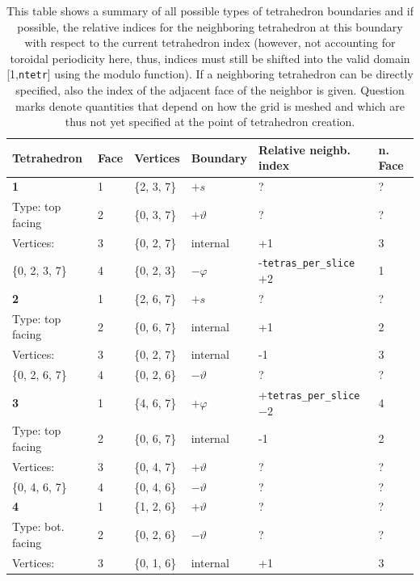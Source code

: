 \documentclass[./main.tex]{subfiles}
\begin{document}
\begin{centering}
	\begin{table}[H]
		\caption{This table shows a summary of all possible types of tetrahedron boundaries and if possible, the relative indices for the neighboring tetrahedron at this boundary with respect to the current tetrahedron index (however, not accounting for toroidal periodicity here, thus, indices must still be shifted into the valid domain [1,\texttt{ntetr}] using the modulo function). If a neighboring tetrahedron can be directly specified, also the index of the adjacent face of the neighbor is given. Question marks denote quantities that depend on how the grid is meshed and which are thus not yet specified at the point of tetrahedron creation.}
		\begin{tabular}{|l|l|l|l|l|l|}
\hline
			 \rowcolor{lightgray}
			Tetrahedron&Face&Vertices&Boundary&Relative neighb. index&n. Face\\
\hline	
			\textbf{1}					&1		&\{2, 3, 7\}		&$+s$			&?			&?		\\
			Type: top facing			&2		&\{0, 3, 7\}		&$+\vartheta$	&?			&?		\\
			Vertices: 	&3		&\{0, 2, 7\}		&internal		&+1			&3		\\
			\{0, 2, 3, 7\}							&4		&\{0, 2, 3\}		&$-\varphi$		&-\texttt{tetras\_per\_slice}$+2$	&1\\
\hline
			\textbf{2}					&1		&\{2, 6, 7\}		&$+s$			&?			&?		\\
			Type: top facing			&2		&\{0, 6, 7\}		&internal		&+1			&2		\\
			Vertices: 	&3		&\{0, 2, 7\}		&internal		&-1			&3		\\
			\{0, 2, 6, 7\}							&4		&\{0, 2, 6\}		&$-\vartheta$	&?			&?		\\
\hline
			\textbf{3}					&1		&\{4, 6, 7\}		&$+\varphi$		&+\texttt{tetras\_per\_slice}$-2$	&4\\
			Type: top facing			&2		&\{0, 6, 7\}		&internal		&-1			&2		\\
			Vertices: 	&3		&\{0, 4, 7\}		&$+\vartheta$	&?			&?		\\
			\{0, 4, 6, 7\}							&4		&\{0, 4, 6\}		&$-\vartheta$	&?			&?		\\
\hline
			\textbf{4}					&1		&\{1, 2, 6\}		&$+\vartheta$	&?			&?		\\
			Type: bot. facing			&2		&\{0, 2, 6\}		&$-\vartheta$	&?			&?		\\
			Vertices: 	&3		&\{0, 1, 6\}		&internal		&+1			&3		\\

\end{tabular}
\end{table}
\end{centering}
\end{document}
